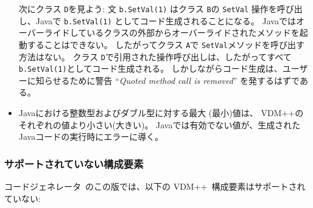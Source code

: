 \documentclass[\pformat,11pt]{jarticle}
\newcommand{\tcg}{コードジェネレータ}
\newcommand{\VDM}{VDM++}
\begin{document}
\begin{itemize}
  次にクラス {\tt D}を見よう:
文 {\tt b.SetVal(1)} はクラス {\tt B}の {\tt SetVal} 操作を呼び出し、Javaで {\tt b.SetVal(1)} としてコード生成されることになる。
Javaではオーバーライドしているクラスの外部からオーバーライドされたメソッドを起動することはできない。
 したがってクラス {\tt A}で {\tt SetVal}メソッドを呼び出す方法はない。
クラス {\tt D}で引用された操作呼び出しは、したがってすべて {\tt b.SetVal(1)}としてコード生成される。
しかしながらコード生成は、ユーザーに知らせるために警告 ``{\em Quoted method call is removed}'' を発するはずである。

\item Javaにおける整数型およびダブル型に対する最大 (最小)値は、 \VDM{}のそれぞれの値より小さい(大きい)。
Javaでは有効でない値が、生成されたJavaコードの実行時にエラーに導く。
\end{itemize}

\subsubsection{サポートされていない構成要素}
\label{lim2}

 \tcg\ のこの版では、以下の \VDM\ 構成要素はサポートされていない:
\end{document}
